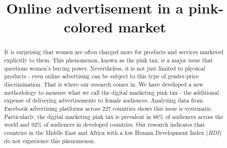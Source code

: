 \documentclass[twocolumn]{bmcart}\usepackage{lineno}
\begin{document}
\begin{frontmatter}

\begin{fmbox}

\title{Online advertisement in a pink-colored market}



\author[
  addressref={aff1},                   corref={aff1},                       email={amir.mehrjoo@imdea.org}   ]{   }

\author[
  addressref={aff2},
  email={rcuevas@inv.it.uc3m.es}
]{  }

\author[
  addressref={aff3},
  email={acrumin@it.uc3m.es}
]{   }




\address[id=aff1]{,          ,                                                                  }
\address[id=aff2]{,
  ,
,
}
\address[id=aff3]{,
  ,
,
}









\begin{abstractbox}

\begin{abstract} It is surprising that women are often charged more for products and services marketed explicitly to them. This phenomenon, known as the pink tax, is a major issue that questions women's buying power. Nevertheless, it is not just limited to physical products - even online advertising can be subject to this type of gender-price discrimination. That is where our research comes in. We have developed a new methodology to measure what we call the digital marketing pink tax - the additional expense of delivering advertisements to female audiences.\color{blue} Analyzing data from Facebook advertising platforms across 227 countries shows this issue is systematic. Particularly, the digital marketing pink tax is prevalent in 88\% of audiences across the world and 92\% of audiences in developed countries. Our research indicates that countries in the Middle East and Africa with a low Human Development Index (\emph{HDI}) do not experience this phenomenon. 


\end{abstract}
\end{abstractbox}
\end{fmbox}
\end{frontmatter}
\end{document}
